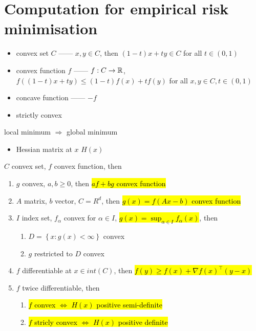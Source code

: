 \section{Computation for empirical risk minimisation}\label{sec:computation-for-empirical-risk-minimisation}

\begin{itemize}
    \item convex set $C$ ------ $x, y \in C$, then $(1 - t)x + ty \in C$ for all $t \in (0, 1)$
    \item convex function $f$ ------ $f: C \rightarrow \mathbb{R}$, $f((1-t)x + ty) \leq (1- t)f(x) + tf(y)$ for all $x,y \in C, t \in (0,1)$
    \item concave function ------ $-f$
    \item strictly convex
\end{itemize}

\begin{fact}
    local minimum $\Rightarrow$ global minimum
\end{fact}

\begin{itemize}
    \item Hessian matrix at $x$ $H(x)$
\end{itemize}

\begin{prop}
    $C$ convex set, $f$ convex function, then
    \begin{enumerate}
        \item $g$ convex, $a, b \geq 0$, then \hl{$af + bg$ convex function}
        \item $A$ matrix, $b$ vector, $C = R^d$, then \hl{$g(x) = f(Ax - b)$ convex function}
        \item $I$ index set, $f_\alpha$ convex for $\alpha \in I$, \hl{$g(x) = \sup_{\alpha \in I} f_{\alpha}(x)$}, then
        \begin{enumerate}
            \item $D = \left\{ x : g(x) < \infty \right\}$ convex
            \item $g$ restricted to $D$ convex
        \end{enumerate}
        \item $f$ differentiable at $x \in int(C)$, then \hl{$f(y) \geq f(x) + \nabla f(x)^\top (y- x)$}
        \item $f$ twice differentiable, then
        \begin{enumerate}
            \item \hl{$f$ convex $\iff$ $H(x)$ positive semi-definite}
            \item \hl{$f$ stricly convex $\iff$ $H(x)$ positive definite}
        \end{enumerate}
    \end{enumerate}
\end{prop}

